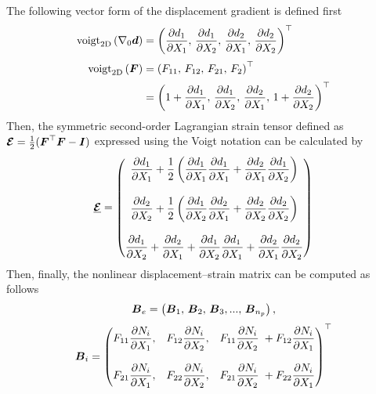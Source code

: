 The following vector form of the displacement gradient is defined first
\begin{align}
\textrm{voigt}_{\textrm{2D}} \left(\nabla_0 {\boldsymbol{d}} \right) & = \left( \frac{\partial d_1}{\partial X_1},\,\frac{\partial d_1}{\partial X_2},\, \frac{\partial d_2}{\partial X_1},\, \frac{\partial d_2}{\partial X_2}\right)^\top \\[0.25em]
\textrm{voigt}_{\textrm{2D}} \left({\boldsymbol{F}}\right) & = \left( F_{11},\,F_{12},\, F_{21},\,F_{2} \right)^\top \notag \\[0.15em] & = \left( 1 + \frac{\partial d_1}{\partial X_1},\,\frac{\partial d_1}{\partial X_2},\, \frac{\partial d_2}{\partial X_1},\,  1 + \frac{\partial d_2}{\partial X_2}\right)^\top 
\end{align}
%
Then, the symmetric second-order Lagrangian strain tensor defined as ${\boldsymbol{\mathcal{E}}} = \frac{1}{2}({\boldsymbol{F}}^\top {\boldsymbol{F}} - \boldsymbol{I})$ expressed using the Voigt notation can be calculated by
%
\begin{equation}
 \underline{\boldsymbol{\mathcal{E}}} = \begin{pmatrix}
\dfrac{\partial d_1}{\partial X_1} + \dfrac{1}{2} \left(\dfrac{\partial d_1}{\partial X_1}\dfrac{\partial d_1}{\partial X_1} + \dfrac{\partial d_2}{\partial X_1}\dfrac{\partial d_1}{\partial X_2} \right) \\[0.25em] \\
\dfrac{\partial d_2}{\partial X_2} + \dfrac{1}{2} \left(\dfrac{\partial d_1}{\partial X_2}\dfrac{\partial d_2}{\partial X_1} + \dfrac{\partial d_2}{\partial X_2}\dfrac{\partial d_2}{\partial X_2} \right) \\[0.25em] \\
\dfrac{\partial d_1}{\partial X_2} + \dfrac{\partial d_2}{\partial X_1} + \dfrac{\partial d_1}{\partial X_2}\dfrac{\partial d_1}{\partial X_1} + \dfrac{\partial d_2}{\partial X_1}\dfrac{\partial d_2}{\partial X_2} 
 \end{pmatrix}
\end{equation}
%
Then, finally, the nonlinear displacement–strain matrix can be computed as follows
\begin{equation}
{\boldsymbol{B}}_{e} = \left({\boldsymbol{B}}_1,\,{\boldsymbol{B}}_2,\,{\boldsymbol{B}}_3, ...,\, {\boldsymbol{B}}_{n_p} \right),
\end{equation}
%
\begin{align}
{\boldsymbol{B}}_i = \begin{pmatrix} 
F_{11} \dfrac{\partial N_{i}}{\partial X_1}, & F_{12}  \dfrac{\partial N_{i}}{\partial X_2}, &  F_{11}  \dfrac{\partial N_{i}}{\partial X_2}  \; + F_{12} \dfrac{\partial N_{i}}{\partial X_1} \\[0.25em] \\
F_{21}  \dfrac{\partial N_{i}}{\partial X_1},  & F_{22}  \dfrac{\partial N_{i}}{\partial X_2}, & F_{21}  \dfrac{\partial N_{i}}{\partial X_2} \; + F_{22}  \dfrac{\partial N_{i}}{\partial X_1}  
\end{pmatrix}^\top
\end{align}
%
